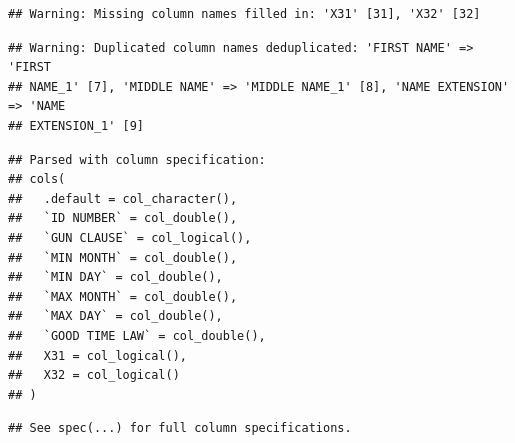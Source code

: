 \documentclass[]{book}
\newenvironment{Shaded}{\begin{snugshade}}{\end{snugshade}}
\newcommand{\KeywordTok}[1]{\textcolor[rgb]{0.13,0.29,0.53}{\textbf{#1}}}
\newcommand{\NormalTok}[1]{#1}
\newcommand{\OperatorTok}[1]{\textcolor[rgb]{0.81,0.36,0.00}{\textbf{#1}}}
\newcommand{\StringTok}[1]{\textcolor[rgb]{0.31,0.60,0.02}{#1}}
\begin{document}
\begin{verbatim}
## Warning: Missing column names filled in: 'X31' [31], 'X32' [32]
\end{verbatim}

\begin{verbatim}
## Warning: Duplicated column names deduplicated: 'FIRST NAME' => 'FIRST
## NAME_1' [7], 'MIDDLE NAME' => 'MIDDLE NAME_1' [8], 'NAME EXTENSION' => 'NAME
## EXTENSION_1' [9]
\end{verbatim}

\begin{verbatim}
## Parsed with column specification:
## cols(
##   .default = col_character(),
##   `ID NUMBER` = col_double(),
##   `GUN CLAUSE` = col_logical(),
##   `MIN MONTH` = col_double(),
##   `MIN DAY` = col_double(),
##   `MAX MONTH` = col_double(),
##   `MAX DAY` = col_double(),
##   `GOOD TIME LAW` = col_double(),
##   X31 = col_logical(),
##   X32 = col_logical()
## )
\end{verbatim}

\begin{verbatim}
## See spec(...) for full column specifications.
\end{verbatim}

\begin{Shaded}
\end{Shaded}
\end{document}
